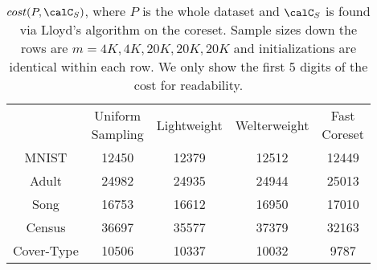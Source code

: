 \begin{table}
    \centering
    \small
    \begin{tabular}{|c|cccc|}
        \hline
        & \makecell{Uniform \\ Sampling} & Lightweight & Welterweight & \makecell{Fast \\ Coreset} \\
        MNIST & 12450 & 12379 & 12512 & 12449 \\
        Adult & 24982 & 24935 & 24944 & 25013 \\
        Song & 16753 & 16612 & 16950 & 17010 \\
        Census & 36697 & 35577 & 37379 & 32163 \\
        Cover-Type & 10506 & 10337 & 10032 & 9787 \\
        \hline
    \end{tabular}
    \caption{$cost(P, \calC_S)$, where $P$ is the whole dataset and $\calC_S$ is found via Lloyd's algorithm on the coreset. Sample sizes down the rows are
    $m=4K,4K,20K,20K,20K$ and initializations are identical within each row. We only show the first 5 digits of the cost for readability.}
    \label{tbl:lloyds}
\end{table}

